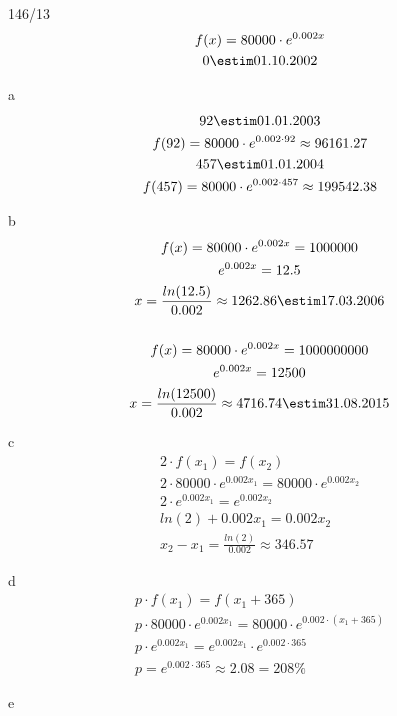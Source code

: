 \begin{exercise}{146/13}
  \begin{gather*}
    f(x) = 80000 \cdot e^{0.002x} \\
    0 \estim 01.10.2002
  \end{gather*}
  \item [a]
  \begin{gather*}
    92 \estim 01.01.2003 \\
    f(92) = 80000 \cdot e^{0.002 \cdot 92} \approx 96161.27 \\
    457 \estim 01.01.2004 \\
    f(457) = 80000 \cdot e^{0.002 \cdot 457} \approx 199542.38 \\
  \end{gather*}
  \item [b]
  \begin{gather*}
    f(x) = 80000 \cdot e^{0.002x} = 1000000 \\
    e^{0.002x} = 12.5 \\
    x = \frac{ln(12.5)}{0.002} \approx 1262.86 \estim 17.03.2006 \\\\
    f(x) = 80000 \cdot e^{0.002x} = 1000000000 \\
    e^{0.002x} = 12500 \\
    x = \frac{ln(12500)}{0.002} \approx 4716.74 \estim 31.08.2015
  \end{gather*}
  \item [c]
  \begin{gather*}
    2 \cdot f(x_1) = f(x_2) \\
    2 \cdot 80000 \cdot e^{0.002x_1} = 80000 \cdot e^{0.002x_2} \\
    2 \cdot e^{0.002x_1} = e^{0.002x_2} \\
    ln(2) + 0.002x_1 = 0.002x_2 \\
    x_2 - x_1 = \frac{ln(2)}{0.002} \approx 346.57
  \end{gather*}
  \item [d]
  \begin{gather*}
    p \cdot f(x_1) = f(x_1 + 365) \\
    p \cdot 80000 \cdot e^{0.002x_1} = 80000 \cdot e^{0.002 \cdot (x_1 + 365)} \\
    p \cdot e^{0.002x_1} = e^{0.002x_1} \cdot e^{0.002 \cdot 365} \\
    p = e^{0.002 \cdot 365} \approx 2.08 = 208\%
  \end{gather*}
  \item [e]

\end{exercise}
